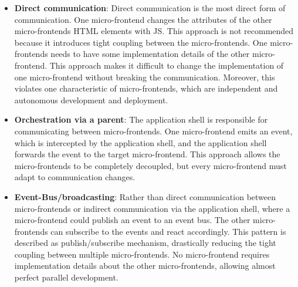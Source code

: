 \begin{itemize}
  \item \textbf{Direct communication}: Direct communication is the most direct form of communication. One micro-frontend changes the attributes of the other micro-frontends \ac{HTML} elements with \ac{JS}. This approach is not recommended because it introduces tight coupling between the micro-frontends. One micro-frontends needs to have some implementation details of the other micro-frontend. This approach makes it difficult to change the implementation of one micro-frontend without breaking the communication. Moreover, this violates one characteristic of micro-frontends, which are independent and autonomous development and deployment.
  \item \textbf{Orchestration via a parent}: The application shell is responsible for communicating between micro-frontends. One micro-frontend emits an event, which is intercepted by the application shell, and the application shell forwards the event to the target micro-frontend. This approach allows the micro-frontends to be completely decoupled, but every micro-frontend must adapt to communication changes.
  \item \textbf{Event-Bus/broadcasting}: Rather than direct communication between micro-frontends or indirect communication via the application shell, where a micro-frontend could publish an event to an event bus. The other micro-frontends can subscribe to the events and react accordingly. This pattern is described as publish/subscribe mechanism, drastically reducing the tight coupling between multiple micro-frontends. No micro-frontend requires implementation details about the other micro-frontends, allowing almost perfect parallel development.
\end{itemize}
